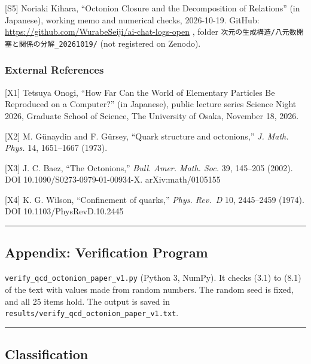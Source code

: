\documentclass[
  a4paper,
]{article}
\begin{document}
{[}S5{]} Noriaki Kihara, ``Octonion Closure and the Decomposition of
Relations'' (in Japanese), working memo and numerical checks,
2026-10-19. GitHub: \url{https://github.com/WurabeSeiji/ai-chat-logs-open} ,
folder \texttt{次元の生成構造/\allowbreak{}八元数閉塞と関係の分解\_\allowbreak{}20261019/\allowbreak{}} (not
registered on Zenodo).

\subsubsection{External References}\label{external-references}

{[}X1{]} Tetsuya Onogi, ``How Far Can the World of Elementary Particles
Be Reproduced on a Computer?'' (in Japanese), public lecture series
Science Night 2026, Graduate School of Science, The University of Osaka,
November 18, 2026.

{[}X2{]} M. Günaydin and F. Gürsey, ``Quark structure and octonions,''
\emph{J. Math. Phys.} 14, 1651--1667 (1973).

{[}X3{]} J. C. Baez, ``The Octonions,'' \emph{Bull. Amer. Math. Soc.}
39, 145--205 (2002). DOI 10.1090/S0273-0979-01-00934-X.
arXiv:math/0105155

{[}X4{]} K. G. Wilson, ``Confinement of quarks,'' \emph{Phys. Rev.~D}
10, 2445--2459 (1974). DOI 10.1103/PhysRevD.10.2445

\begin{center}\rule{0.5\linewidth}{0.5pt}\end{center}

\subsection{Appendix: Verification
Program}\label{appendix-verification-program}

\texttt{verify\_\allowbreak{}qcd\_\allowbreak{}octonion\_\allowbreak{}paper\_\allowbreak{}v1.py} (Python 3, NumPy). It
checks (3.1) to (8.1) of the text with values made from random numbers.
The random seed is fixed, and all 25 items hold. The output is saved in
\texttt{results/\allowbreak{}verify\_\allowbreak{}qcd\_\allowbreak{}octonion\_\allowbreak{}paper\_\allowbreak{}v1.txt}.

\begin{center}\rule{0.5\linewidth}{0.5pt}\end{center}

\subsection{Classification}\label{classification}
\end{document}

